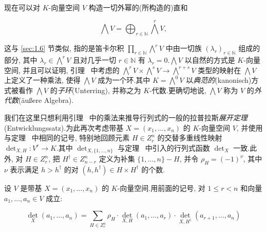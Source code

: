 现在可以对 $K$-向量空间 $V$ 构造一切外幂的(所构造的)直和

\[
\bigwedge V = \bigoplus_{r \in \mathbb{N}} \bigwedge^r V,
\]

这与 \ref{sec:1.6} 节类似, 指的是笛卡尔积 $\prod_{r \in \mathbb{N}} \bigwedge^r V$ 中由一切族 $(\lambda_r)_{r \in \mathbb{N}}$ 组成的部分, 其中 $\lambda_r \in \bigwedge^r V$ 且对几乎一切 $r \in \mathbb{N}$ 有 $\lambda_r = 0$.$\bigwedge V$ 以自然的方式是 $K$-向量空间, 并且可以证明, 引理~ 中考虑的 $\bigwedge^r V \times \bigwedge^s V \longrightarrow \bigwedge^{r + s} V$ 类型的映射在 $\bigwedge V$ 上定义了一种乘法, 使得 $\bigwedge V$ 成为一个环.其中 $K = \bigwedge^0 V$ 以\emph{典范的}(\textup{kanonisch})方式被看作 $\bigwedge V$ 的\emph{子环}(\textup{Unterring}), 并称之为 $K$-代数.更确切地说, $\bigwedge V$ 称为 $V$ 的\emph{外代数}(\textup{äußere Algebra}).

我们在这里只想利用引理~ 中的乘法来推导行列式的一般的拉普拉斯\emph{展开定理}(\textup{Entwicklungssatz}).为此再次考虑带基 $X = (x_1, \ldots, x_n)$ 的 $K$-向量空间 $V$, 并使用与定理~ 中相同的记号, 特别地回顾元素 $H \in Z_r^n$ 的交替多重线性映射 $\det_{X, H} \colon V^r \longrightarrow K$.其中 $\det_{X, \{1, \ldots, n\}}$ 与定理~ 中引入的行列式函数 $\det_X$ 一致.此外, 对 $H \in Z_r^n$, 把 $H^{\dagger} \in Z_{n-r}^n$ 定义为补集 $\{1, \ldots, n\} - H$, 并令 $\rho_H = (-1)^{\nu}$, 其中 $\nu$ 表示满足 $h > h^{\dagger}$ 的对 $(h, h^{\dagger}) \in H \times H^{\dagger}$ 的个数.

\begin{theorem}[一般的拉普拉斯展开定理]\label{thm:4.5.7}
设 $V$ 是带基 $X = (x_1, \ldots, x_n)$ 的 $K$-向量空间.用前面的记号, 对 $1 \leq r < n$ 和向量 $a_1, \ldots, a_n \in V$ 成立:

\[
\det_X(a_1, \ldots, a_n) = \sum_{H \in Z_r^n} \rho_H \cdot \det_{X, H}(a_1, \ldots, a_r) \cdot \det_{X, H^{\dagger}}(a_{r+1}, \ldots, a_n)
\]
\end{theorem}

